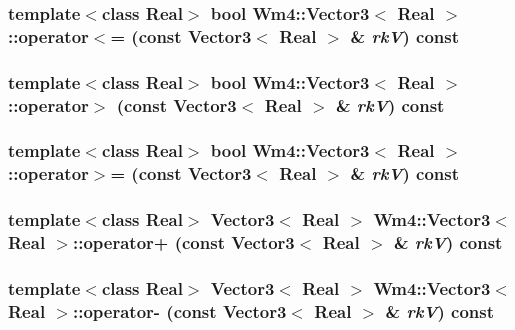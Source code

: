 \subsubsection{\setlength{\rightskip}{0pt plus 5cm}template$<$class Real$>$ bool {\bf Wm4::Vector3}$<$ Real $>$::operator$<$= (const {\bf Vector3}$<$ Real $>$ \& {\em rk\-V}) const}\label{classWm4_1_1Vector3_7800f2c726bd9eb09892f767cd7aba19}


\subsubsection{\setlength{\rightskip}{0pt plus 5cm}template$<$class Real$>$ bool {\bf Wm4::Vector3}$<$ Real $>$::operator$>$ (const {\bf Vector3}$<$ Real $>$ \& {\em rk\-V}) const}\label{classWm4_1_1Vector3_023cea9ce14058000639c93290ca4295}


\subsubsection{\setlength{\rightskip}{0pt plus 5cm}template$<$class Real$>$ bool {\bf Wm4::Vector3}$<$ Real $>$::operator$>$= (const {\bf Vector3}$<$ Real $>$ \& {\em rk\-V}) const}\label{classWm4_1_1Vector3_4854e5f3f495c178e471cda42d896224}


\subsubsection{\setlength{\rightskip}{0pt plus 5cm}template$<$class Real$>$ {\bf Vector3}$<$ Real $>$ {\bf Wm4::Vector3}$<$ Real $>$::operator+ (const {\bf Vector3}$<$ Real $>$ \& {\em rk\-V}) const\hspace{0.3cm}{\tt  [inline]}}\label{classWm4_1_1Vector3_e771fc04c155a10e188bcf2e2b957676}


\subsubsection{\setlength{\rightskip}{0pt plus 5cm}template$<$class Real$>$ {\bf Vector3}$<$ Real $>$ {\bf Wm4::Vector3}$<$ Real $>$::operator- (const {\bf Vector3}$<$ Real $>$ \& {\em rk\-V}) const\hspace{0.3cm}{\tt  [inline]}}\label{classWm4_1_1Vector3_fd35acae902bdf5171c4ae77ecee371e}


